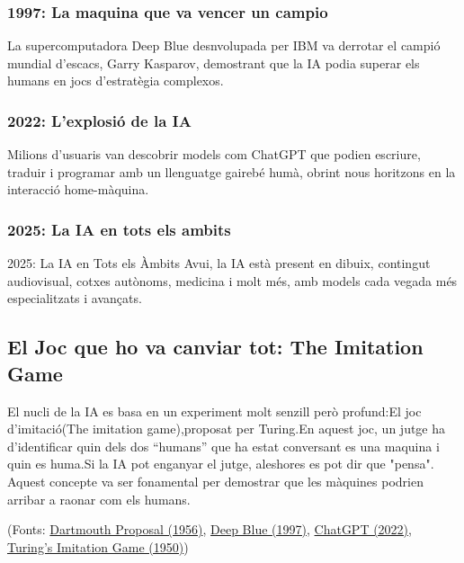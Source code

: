\subsubsection{1997: La maquina que va vencer un campio}
 La supercomputadora Deep Blue desnvolupada per IBM va derrotar el campió mundial d’escacs, Garry Kasparov, demostrant que la IA podia superar els humans en jocs d’estratègia complexos.
\subsubsection{2022: L'explosió de la IA}
Milions d’usuaris van descobrir models com ChatGPT que podien escriure, traduir i programar amb un llenguatge gairebé humà, obrint nous horitzons en la interacció home-màquina.
\subsubsection{2025: La IA en tots els ambits}
    2025: La IA en Tots els Àmbits
    Avui, la IA està present en dibuix, contingut audiovisual, cotxes autònoms, medicina i molt més, amb models cada vegada més especialitzats i avançats.
\subsection{El Joc que ho va canviar tot: The Imitation Game}
El nucli de la IA es basa en un experiment molt senzill però profund:El joc d'imitació(The imitation game),proposat per Turing.En aquest joc, un jutge ha d’identificar quin dels dos ``humans'' que ha estat conversant es una maquina  i quin es huma.Si la IA pot enganyar el jutge, aleshores es pot dir que "pensa". Aquest concepte va ser fonamental per demostrar que les màquines podrien arribar a raonar com els humans.



(Fonts: \href{https://raysolomonoff.com/dartmouth/boxa/dart564props.pdf}{Dartmouth Proposal (1956)}, \href{https://www.ibm.com/history/deep-blue}{Deep Blue (1997)}, \href{https://openai.com/index/chatgpt/}{ChatGPT (2022)}, \href{https://academic.oup.com/mind/article-abstract/LIX/236/433/986238?redirectedF}{Turing's Imitation Game (1950)})
